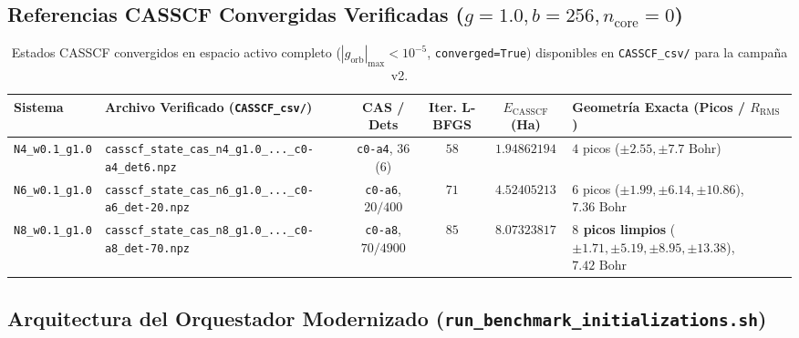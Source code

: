 \documentclass[10pt,a4paper]{article}
\begin{document}
\subsection{Referencias CASSCF Convergidas Verificadas (\texorpdfstring{$g=1.0, b=256, n_{\mathrm{core}}=0$}{g=1.0, b=256, n\_core=0})}

\begin{table}[H]
\centering
\caption{Estados CASSCF convergidos en espacio activo completo ($|g_{\mathrm{orb}}|_{\max} < 10^{-5}$, \texttt{converged=True}) disponibles en \texttt{CASSCF\_csv/} para la campa\~na v2.}
\begin{adjustbox}{max width=\textwidth}
\begin{tabular}{llcccl}
\toprule
\textbf{Sistema} & \textbf{Archivo Verificado (\texttt{CASSCF\_csv/})} & \textbf{CAS / Dets} & \textbf{Iter. L-BFGS} & \textbf{$E_{\mathrm{CASSCF}}$ (Ha)} & \textbf{Geometr\'ia Exacta (Picos / $R_{\mathrm{RMS}}$)} \\
\midrule
\texttt{N4\_w0.1\_g1.0} & \texttt{casscf\_state\_cas\_n4\_g1.0\_...\_c0-a4\_det6.npz} & \texttt{c0-a4}, $36$ ($6$) & $58$ & $1.94862194$ & $4$ picos ($\pm 2.55, \pm 7.7\text{ Bohr}$) \\
\texttt{N6\_w0.1\_g1.0} & \texttt{casscf\_state\_cas\_n6\_g1.0\_...\_c0-a6\_det-20.npz} & \texttt{c0-a6}, $20/400$ & $71$ & $4.52405213$ & $6$ picos ($\pm 1.99, \pm 6.14, \pm 10.86$), $7.36\text{ Bohr}$ \\
\texttt{N8\_w0.1\_g1.0} & \texttt{casscf\_state\_cas\_n8\_g1.0\_...\_c0-a8\_det-70.npz} & \texttt{c0-a8}, $70/4900$ & $85$ & $8.07323817$ & \textbf{$8$ picos limpios} ($\pm 1.71, \pm 5.19, \pm 8.95, \pm 13.38$), $7.42\text{ Bohr}$ \\
\bottomrule
\end{tabular}
\end{adjustbox}
\end{table}

\subsection{Arquitectura del Orquestador Modernizado (\texttt{run\_benchmark\_initializations.sh})}
\end{document}
